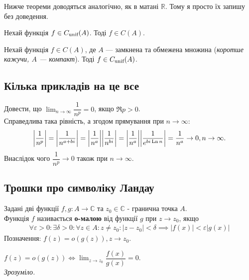 \documentclass{math_library}
\begin{document}
Нижче теореми доводяться аналогічно, як в матані $\mathbb{R}$. Тому я просто їх запишу без доведення.

\begin{theorem}
Нехай функція $f \in C_{\text{unif}}(A)$. Тоді $f \in C(A)$.
\end{theorem}

\begin{theorem}
Нехай функція $f \in C(A)$, де $A$ --- замкнена та обмежена множина (\textit{коротше кажучи, $A$ --- компакт}). Тоді $f \in C_{\text{unif}}(A)$.
\end{theorem}

\subsection*{Кілька прикладів на це все}
\begin{example}
Довести, що $\displaystyle\lim_{n \to \infty} \dfrac{1}{n^p} = 0$, якщо $\Re p > 0$.
\bigskip \\
Справедлива така рівність, а згодом прямування при $n \to \infty$:
\[
\abs{\dfrac{1}{n^p}} = \abs{\dfrac{1}{n^{a+bi}}} = \abs{\dfrac{1}{n^a}} \abs{\dfrac{1}{n^{bi}}} = \abs{\dfrac{1}{n^a}} \abs{\dfrac{1}{e^{bi \operatorname{Ln} n}}} = \dfrac{1}{n^a} \to 0, n \to \infty.
\]
Внаслідок чого $\dfrac{1}{n^p} \to 0$ також при $n \to \infty$.
\end{example}

\subsection{Трошки про символіку Ландау}
\begin{definition}
Задані дві функції $f,g: A \to \mathbb{C}$ та $z_0 \in \mathbb{C}$ - гранична точка $A$.\\
Функція $f$ називається \textbf{о-малою} від функції $g$ при $z \to z_0$, якщо
\begin{align*}
\forall \varepsilon > 0: \exists \delta > 0: \forall z \in A: z \neq z_0: |z-z_0| < \delta \implies |f(x)| < \varepsilon |g(x)|
\end{align*}
Позначення: $f(z) = o(g(z)), z \to z_0$.
\end{definition}

\begin{theorem}
$f(z) = o(g(z)) \iff \displaystyle\lim_{z \to z_0} \dfrac{f(x)}{g(x)} = 0$.\\
\textit{Зрозуміло.}
\end{theorem}
\end{document}
